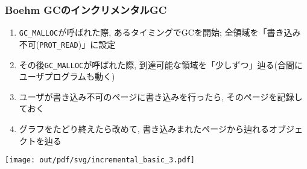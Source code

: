 \documentclass[12pt,dvipdfmx]{beamer}
\begin{document}
\begin{frame}
\frametitle{Boehm GCのインクリメンタルGC}
\begin{enumerate}
\item {\tt GC\_MALLOC}が呼ばれた際, あるタイミングでGCを開始; 全領域を「書き込み不可({\tt PROT\_READ})」に設定
\item その後{\tt GC\_MALLOC}が呼ばれた際, 到達可能な領域を「少しずつ」辿る(合間にユーザプログラムも動く)
\item ユーザが書き込み不可のページに書き込みを行ったら, そのページを記録しておく
\item グラフをたどり終えたら改めて, 書き込みまれたページから辿れるオブジェクトを辿る
\end{enumerate}

\begin{center}
\texttt{[image: out/pdf/svg/incremental\_basic\_3.pdf]}
\end{center}
\end{frame}

  
\end{document}
